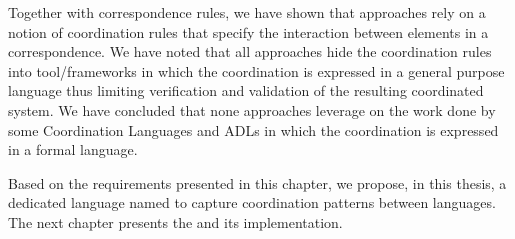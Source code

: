 Together with correspondence rules, we have shown that approaches rely on a notion of coordination rules that specify the interaction between elements in a correspondence. We have noted that all approaches hide the coordination rules into tool/frameworks in which the coordination is expressed in a general purpose language thus limiting verification and validation of the resulting coordinated system. We have concluded that none approaches leverage on the work done by some Coordination Languages and ADLs in which the coordination is expressed in a formal language.  

Based on the requirements presented in this chapter, we propose, in this thesis, a dedicated language named \bcool to capture coordination patterns between languages. The next chapter presents the \bcool and its implementation.




